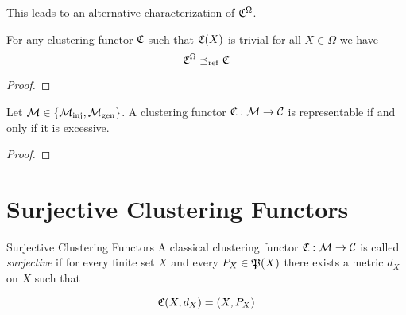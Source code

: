 This leads to an alternative characterization of $\Cf^\Omega$.

\begin{proposition}{}{}
For any clustering functor $\Cf$ such that $\Cf(X)$ is trivial for all $X \in \Omega$ we have
$$
\Cf^\Omega \refines \Cf
$$
\end{proposition}

\begin{proof}
\newresult[]
\end{proof}

\begin{theorem}{\cite{Carlsson2010}}{}
Let $\M \in \{\inj, \gen\}$. A clustering functor $\Cf: \M \to \C$ is representable if and only if it is excessive.
\end{theorem}

\begin{proof}
\todo
\end{proof}





\section{Surjective Clustering Functors}

\begin{definition}{Surjective Clustering Functors \source}{}
    A classical clustering functor $\Cf: \M \to \C$ is called \emph{surjective} if for every finite set $X$ and every $P_X \in \P(X)$ there exists a metric $d_X$ on $X$ such that

    \begin{equation*}
        \Cf(X,d_X) = (X,P_X)
    \end{equation*}

\end{definition}

